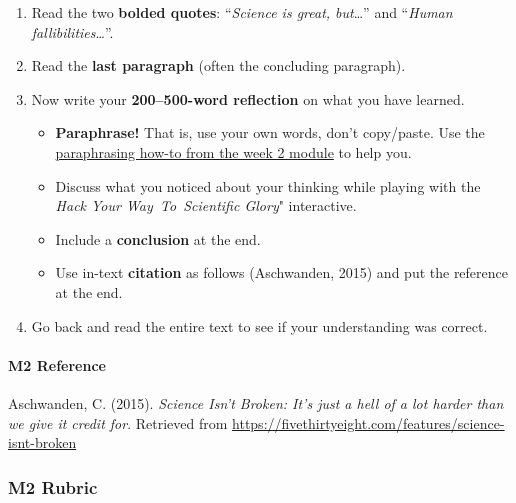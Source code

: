 \documentclass[
  openany]{book}
\begin{document}
\begin{enumerate}
\def\labelenumi{\arabic{enumi}.}
\setcounter{enumi}{5}
\item
  Read the two \textbf{bolded quotes}: ``\emph{Science is great, but}\ldots{}'' and ``\emph{Human fallibilities}\ldots{}''.
\item
  Read the \textbf{last paragraph} (often the concluding paragraph).
\item
  Now write your \textbf{200--500-word reflection} on what you have learned.

  \begin{itemize}
  \item
    \textbf{Paraphrase!} That is, use your own words, don't copy/paste. Use the \href{https://q.utoronto.ca/courses/204826/pages/w2-paraphrasing}{paraphrasing how-to from the week 2 module} to help you.
  \item
    Discuss what you noticed about your thinking while playing with the \emph{Hack Your Way~To~Scientific Glory}" interactive.
  \item
    Include a \textbf{conclusion} at the end.
  \item
    Use in-text \textbf{citation} as follows (Aschwanden, 2015) and put the reference at the end.
  \end{itemize}
\item
  Go back and read the entire text to see if your understanding was correct.
\end{enumerate}

\hypertarget{m2-reference}{%
\paragraph{M2 Reference}\label{m2-reference}}

Aschwanden, C. (2015). \emph{Science Isn't Broken: It's just a hell of a lot harder than we give it credit for}. Retrieved from \url{https://fivethirtyeight.com/features/science-isnt-broken}

\hypertarget{m2-rubric}{%
\subsubsection{M2 Rubric}\label{m2-rubric}}
\end{document}
